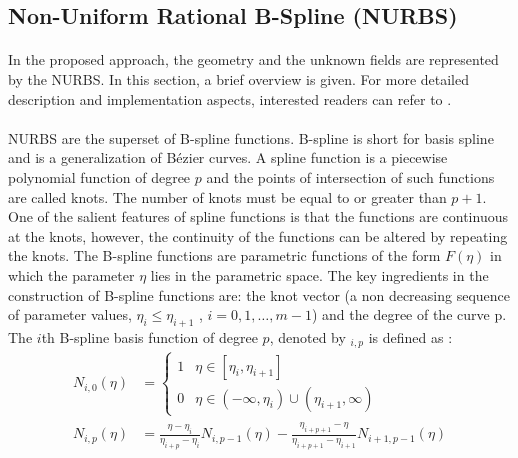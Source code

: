 \subsection{Non-Uniform Rational B-Spline (NURBS)}
\label{lr_sec:NURBS}
\paragraph{}
In the proposed approach, the geometry and the unknown fields are represented by the NURBS.
In this section, a brief overview is given.
For more detailed description and implementation aspects, interested readers can refer to \citep{Pie1997,NGUYEN201589}.
\paragraph{}
NURBS are the superset of B-spline functions.
B-spline is short for basis spline and is a generalization of Bézier curves.
A spline function is a piecewise polynomial function of degree $p$ and the points of intersection of such functions are called knots.
The number of knots must be equal to or greater than $p + 1$.
One of the salient features of spline functions is that the functions are continuous at the knots, however, the continuity of the functions can be altered by repeating the knots.
The B-spline functions are parametric functions of the form $F(\eta)$ in which the parameter $\eta$ lies in the parametric space.
The key ingredients in the construction of B-spline functions are: the knot vector (a non decreasing sequence of parameter values, $\eta_i \leq \eta_{i+1}$ , $i = 0,1,\dots,m -1$) and the degree of the curve p. The $i$th B-spline basis function of degree $p$, denoted by $_{i,p}$ is defined as \citep{Pie1997}:
\begin{equation}
    \begin{aligned}
        N_{i,0}(\eta) &=
            \begin{cases}
                1   & \eta \in [\eta_i, \eta_{i+1}]   \\
                0   & \eta \in (-\infty, \eta_i) \cup (\eta_{i+1}, \infty )
            \end{cases}\\
        N_{i,p}(\eta) &= 
            \frac{\eta - \eta_i}{\eta_{i+p}-\eta_i}     N_{i,p-1}(\eta) - 
            \frac{\eta_{i+p+1}-\eta}{\eta_{i+p+1} - \eta_{i+1}}     N_{i+1,p-1}(\eta)
    \end{aligned}
    \label{lr_nurbs_basis}
\end{equation}
